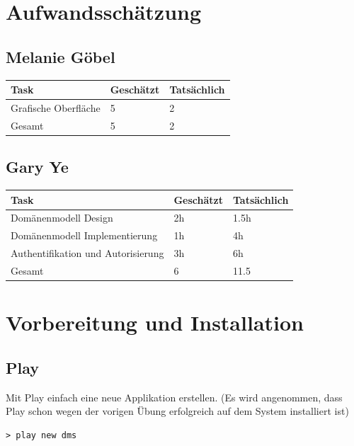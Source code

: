 \documentclass[11pt, a4paper]{article}
\begin{document}
\section{Aufwandsschätzung}

\subsection*{Melanie Göbel}
\begin{center}
  \begin{tabular}{| l | l | l |}
    \hline
    Task & Geschätzt & Tatsächlich \\ \hline    
		Grafische Oberfläche & 5 & 2 \\ \hline
		Gesamt & 5 & 2 \\ \hline
  \end{tabular}
\end{center}


\subsection*{Gary Ye}
\begin{center}
  \begin{tabular}{| l | l | l |}
    \hline
    Task & Geschätzt & Tatsächlich \\ \hline
    Domänenmodell Design & 2h & 1.5h \\ \hline
		Domänenmodell Implementierung & 1h & 4h \\ \hline
    Authentifikation und Autorisierung & 3h & 6h \\ \hline
		Gesamt & 6 & 11.5 \\ \hline
  \end{tabular}
\end{center}

\section{Vorbereitung und Installation}
\subsection{Play}

Mit Play einfach eine neue Applikation erstellen. (Es wird angenommen, dass Play schon wegen der vorigen Übung erfolgreich auf dem System installiert ist)

\begin{lstlisting}
> play new dms
\end{lstlisting}
\end{document}
